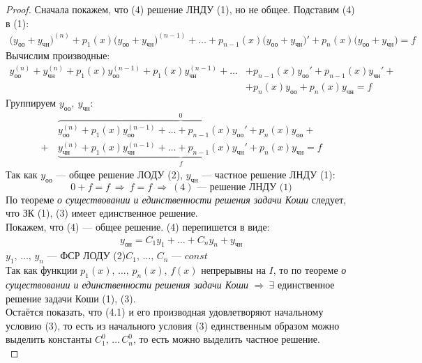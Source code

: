 \begin{proof}
    Сначала покажем, что (4) решение ЛНДУ (1), но не общее.
    Подставим (4) в (1):
    \begin{align*}
        \big(y_{\text{оо}} + y_{\text{чн}}\big)^{(n)} + p_1(x) \big(y_{\text{оо}} + y_{\text{чн}}\big)^{(n-1)} + \ldots + p_{n-1}(x) \big(y_{\text{оо}} + y_{\text{чн}}\big)' + p_n(x) \big(y_{\text{оо}} + y_{\text{чн}}\big) = f
    \end{align*}
    Вычислим производные:
    \begin{align*}
        y_{\text{оо}}^{(n)} + y_{\text{чн}}^{(n)} + p_1(x)y_{\text{оо}}^{(n-1)} + p_1(x) y_{\text{чн}}^{(n-1)} + \ldots &+ p_{n-1}(x)y_{\text{оо}}' + p_{n-1}(x) y_{\text{чн}}' + \\ 
        &+ p_{n}(x)y_{\text{оо}} + p_{n}(x) y_{\text{чн}} = f
    \end{align*}
    Группируем $y_{\text{оо}},\ y_{\text{чн}}\colon$
    \begin{align*}
        &\overbrace{y_{\text{оо}}^{(n)} + p_1(x)y_{\text{оо}}^{(n-1)} + \ldots + p_{n-1}(x)y_{\text{оо}}' + p_{n}(x)y_{\text{оо}}}^0 + \\ 
        +\, &\underbrace{y_{\text{чн}}^{(n)} + p_1(x) y_{\text{чн}}^{(n-1)} + \ldots  + p_{n-1}(x) y_{\text{чн}}' + p_{n}(x) y_{\text{чн}}}_f = f
    \end{align*}
    Так как $y_{\text{оо}}$ --- общее решение ЛОДУ (2), $y_{\text{чн}}$ --- частное решение ЛНДУ (1):
    \[
    0 + f = f\ \Rightarrow\ f = f\ \Rightarrow\ (4) \text{ --- решение ЛНДУ (1)}
    \]
    По теореме \textit{о существовании и единственности решения задачи Коши} следует, что ЗК (1), (3) имеет единственное решение.\\[1ex]
    Покажем, что (4) --- общее решение. (4) перепишется в виде:
    \begin{align*}
        y_{\text{он}} = C_1 y_1 + \dots + C_n y_n + y_{\text{чн}} \tag{4.1}
    \end{align*}
    $y_1,\, \ldots,\, y_n$ --- ФСР ЛОДУ (2)\qquad $C_1,\, \ldots,\, C_n$ --- $const$\\[1ex]
    Так как функции $p_1(x),\, \ldots,\, p_n(x),\, f(x)$ непрерывны на $I$, то по теореме \textit{о существовании и единственности решения задачи Коши} $\Rightarrow\ \exists$ единственное решение задачи Коши (1), (3). \\[1ex]
    Остаётся показать, что (4.1) и его производная удовлетворяют начальному условию (3), то есть из начального условия (3) единственным образом можно выделить константы $C_1^0,\, \ldots\, C_n^0$, то есть можно выделить частное решение. \\

\end{proof}
